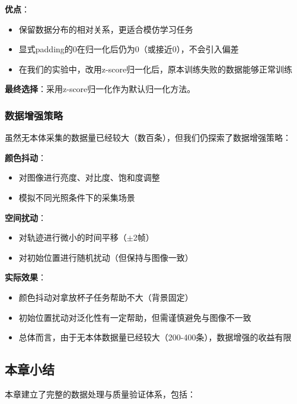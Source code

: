 \textbf{优点}：
\begin{itemize}[leftmargin=2em]
    \item 保留数据分布的相对关系，更适合模仿学习任务
    \item 显式padding的0在归一化后仍为0（或接近0），不会引入偏差
    \item 在我们的实验中，改用z-score归一化后，原本训练失败的数据能够正常训练
\end{itemize}

\textbf{最终选择}：采用z-score归一化作为默认归一化方法。

\subsubsection{数据增强策略}

虽然无本体采集的数据量已经较大（数百条），但我们仍探索了数据增强策略：

\textbf{颜色抖动}：
\begin{itemize}[leftmargin=2em]
    \item 对图像进行亮度、对比度、饱和度调整
    \item 模拟不同光照条件下的采集场景
\end{itemize}

\textbf{空间扰动}：
\begin{itemize}[leftmargin=2em]
    \item 对轨迹进行微小的时间平移（$\pm$2帧）
    \item 对初始位置进行随机扰动（但保持与图像一致）
\end{itemize}

\textbf{实际效果}：
\begin{itemize}[leftmargin=2em]
    \item 颜色抖动对拿放杯子任务帮助不大（背景固定）
    \item 初始位置扰动对泛化性有一定帮助，但需谨慎避免与图像不一致
    \item 总体而言，由于无本体数据量已经较大（200-400条），数据增强的收益有限
\end{itemize}

\subsection{本章小结}

本章建立了完整的数据处理与质量验证体系，包括：

